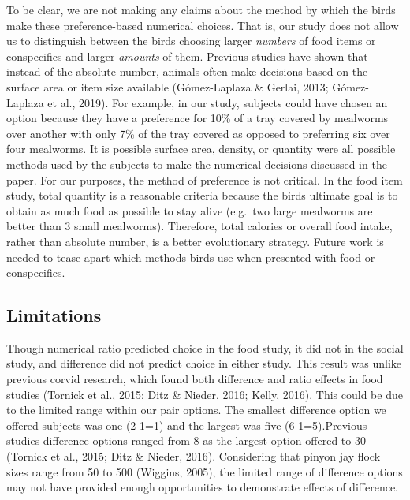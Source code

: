 \documentclass[
  english,
  ,doc,floatsintext]{apa6}
\begin{document}
To be clear, we are not making any claims about the method by which the birds make these preference-based numerical choices. That is, our study does not allow us to distinguish between the birds choosing larger \emph{numbers} of food items or conspecifics and larger \emph{amounts} of them. Previous studies have shown that instead of the absolute number, animals often make decisions based on the surface area or item size available (Gómez-Laplaza \& Gerlai, 2013; Gómez-Laplaza et al., 2019). For example, in our study, subjects could have chosen an option because they have a preference for 10\% of a tray covered by mealworms over another with only 7\% of the tray covered as opposed to preferring six over four mealworms. It is possible surface area, density, or quantity were all possible methods used by the subjects to make the numerical decisions discussed in the paper. For our purposes, the method of preference is not critical. In the food item study, total quantity is a reasonable criteria because the birds ultimate goal is to obtain as much food as possible to stay alive (e.g.~two large mealworms are better than 3 small mealworms). Therefore, total calories or overall food intake, rather than absolute number, is a better evolutionary strategy. Future work is needed to tease apart which methods birds use when presented with food or conspecifics.

\hypertarget{limitations}{%
\subsection{Limitations}\label{limitations}}

Though numerical ratio predicted choice in the food study, it did not in the social study, and difference did not predict choice in either study. This result was unlike previous corvid research, which found both difference and ratio effects in food studies (Tornick et al., 2015; Ditz \& Nieder, 2016; Kelly, 2016). This could be due to the limited range within our pair options. The smallest difference option we offered subjects was one (2-1=1) and the largest was five (6-1=5).Previous studies difference options ranged from 8 as the largest option offered to 30 (Tornick et al., 2015; Ditz \& Nieder, 2016). Considering that pinyon jay flock sizes range from 50 to 500 (Wiggins, 2005), the limited range of difference options may not have provided enough opportunities to demonstrate effects of difference.
\end{document}
